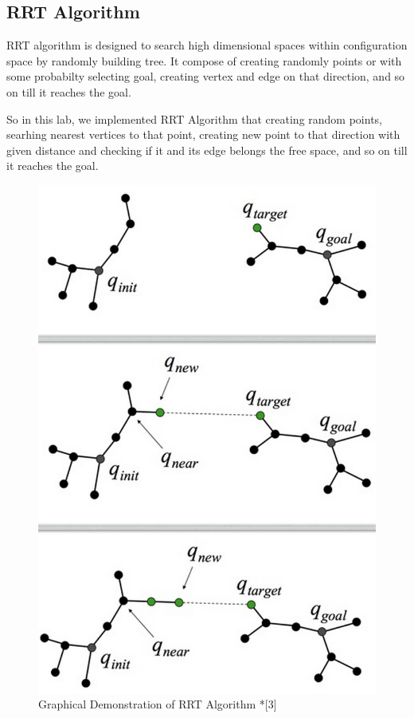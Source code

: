 \documentclass{article}
\begin{document}
	\subsection{RRT Algorithm}
	RRT algorithm is designed to search high dimensional spaces within configuration space by randomly building tree. It compose of creating randomly points or with some probabilty selecting goal, creating vertex and edge on that direction, and so on till it reaches the goal. \par
	So in this lab, we implemented RRT Algorithm that creating random points, searhing nearest vertices to that point, creating new point to that direction with given distance and checking if it and its edge belongs the free space, and so on till it reaches the goal.

\begin{figure}[H]
\begin{center}
\includegraphics[scale=0.2]{RRTAlgorithm.png}
\caption{Graphical Demonstration of RRT Algorithm *[3]}
\end{center}
\end{figure}	
\end{document}
